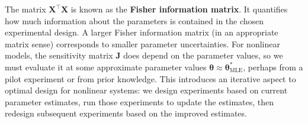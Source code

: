 The matrix $\mathbf{X}^\top \mathbf{X}$ is known as the \textbf{Fisher information matrix}. It quantifies how much information about the parameters is contained in the chosen experimental design. A larger Fisher information matrix (in an appropriate matrix sense) corresponds to smaller parameter uncertainties. For nonlinear models, the sensitivity matrix $\mathbf{J}$ does depend on the parameter values, so we must evaluate it at some approximate parameter values $\boldsymbol{\theta} \approx \boldsymbol{\theta}^*_{\text{MLE}}$, perhaps from a pilot experiment or from prior knowledge. This introduces an iterative aspect to optimal design for nonlinear systems: we design experiments based on current parameter estimates, run those experiments to update the estimates, then redesign subsequent experiments based on the improved estimates.

